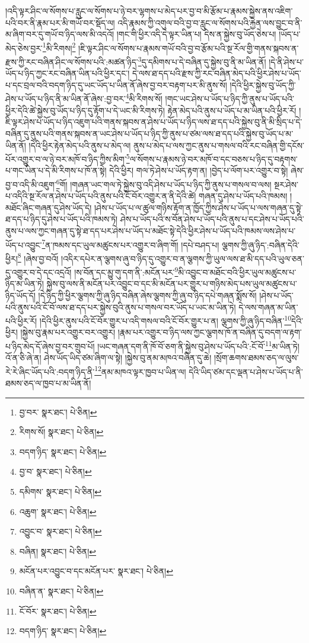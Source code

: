 །འདི་ལྟར་ཤིང་ལ་སོགས་པ་རླུང་ལ་སོགས་པ་ཉེ་བར་ལྷགས་པ་མེད་པར་བྱ་བ་མི་རྩོམ་པ་རྣམས་སྐྱེས་ནས་འཇིག་པའི་བར་ནི་རྣམ་པར་མི་གཡོ་བར་སྡོད་ལ། འདི་རྣམས་ཀྱི་འགུལ་བའི་བྱ་བ་རླུང་ལ་སོགས་པའི་རྐྱེན་ལས་བྱུང་བ་ནི་མ་ཞིག་བར་དུ་གཡོ་བ་ཉིད་ལས་མི་འདའོ། །གང་གི་ཕྱིར་འདི་དེ་ལྟར་ཡིན་པ། དེས་ན་སྐྱེས་བུ་ཡོད་ཅེས་པ། །ཡོད་པ་མེད་ཅེས་བྱར་\footnote{བྱ་བར་  སྣར་ཐང་།  པེ་ཅིན། }མི་རིགས།\footnote{རིགས་སོ།  སྣར་ཐང་།  པེ་ཅིན། } །ཇི་ལྟར་ཤིང་ལ་སོགས་པ་རྣམས་གཡོ་བའི་བྱ་བ་རྩོམ་པའི་སྔ་རོལ་གྱི་གནས་སྐབས་ན་རྫས་ཀྱི་རང་བཞིན་ཤིང་ལ་སོགས་པའི་:མཚན་ཉིད་\footnote{བདག་ཉིད་  སྣར་ཐང་།  པེ་ཅིན། }དུ་དམིགས་པ་དེ་བཞིན་དུ་སྐྱེས་བུ་ནི་མ་ཡིན་ནོ། །དེ་ནི་ཤེས་པ་ཡོད་པ་ཉིད་ཀྱང་རང་བཞིན་ཡིན་པའི་ཕྱིར་དང་། དེ་ལས་ཐ་དད་པའི་རྫས་ཀྱི་རང་བཞིན་མེད་པའི་ཕྱིར་ཤེས་པ་ཡོད་པ་དང་བྲལ་བའི་བདག་ཉིད་དུ་ཡང་ཡོད་པ་ཡིན་ནོ་ཞེས་བྱ་བར་བརྟག་པར་མི་ནུས་སོ། །དེའི་ཕྱིར་སྐྱེས་བུ་ཡོད་ཀྱི་ཤེས་པ་ཡོད་པ་ཉིད་ནི་མ་ཡིན་ནོ་ཞེས་:བྱ་བར་\footnote{བྱ་བ་  སྣར་ཐང་།  པེ་ཅིན། }མི་རིགས་སོ། །གང་ཡང་ཤེས་པ་ཡོད་པ་ཉིད་ཀྱི་ནུས་པ་ཡོད་པའི་ཕྱིར་དེའི་ཚེ་སྐྱེས་བུ་ཡོད་པ་ཉིད་དུ་རྟོག་པ་དེ་ཡང་མི་རིགས་ཏེ། རྟེན་མེད་པའི་ནུས་པ་ཡོད་པ་མ་ཡིན་པའི་ཕྱིར་རོ། །ཇི་ལྟར་ཤེས་པ་ཡོད་པ་ཉིད་འཇུག་པའི་གནས་སྐབས་ན་ཤེས་པ་ཡོད་པ་ཉིད་ལས་ཐ་དད་པའི་སྐྱེས་བུ་ནི་མི་སྲིད་པ་དེ་བཞིན་དུ་ནུས་པའི་གནས་སྐབས་ན་ཡང་ཤེས་པ་ཡོད་པ་ཉིད་ཀྱི་ནུས་པ་ཙམ་ལས་ཐ་དད་པའི་སྐྱེས་བུ་ཡོད་པ་མ་ཡིན་ནོ། །དེའི་ཕྱིར་རྟེན་མེད་པའི་ནུས་པ་མེད་ལ། ནུས་པ་མེད་པ་ལས་ཀྱང་ནུས་པ་གསལ་བའི་རང་བཞིན་གྱི་དངོས་པོར་འགྱུར་བ་ལ་ཉེ་བར་མཁོ་བ་ཉིད་ཀྱིས་མིག་\footnote{དམིགས་  སྣར་ཐང་།  པེ་ཅིན། }ལ་སོགས་པ་རྣམས་ཉེ་བར་མཁོ་བ་དང་བཅས་པ་ཉིད་དུ་བརྟགས་པ་གང་ཡིན་པ་དེ་མི་རིགས་པ་ཁོ་ན་སྟེ། དེའི་ཕྱིར། གལ་ཏེ་ཤེས་པ་ཡོད་རྟག་ན། །བྱེད་པ་ལོག་པར་འགྱུར་བ་སྟེ། ཞེས་བྱ་བ་འདི་མི་འཇུག་\footnote{འཆུག་  སྣར་ཐང་།  པེ་ཅིན། }གོ། །གཞན་ཡང་གལ་ཏེ་སྐྱེས་བུ་འདི་ཤེས་པ་ཡོད་པ་ཉིད་ཀྱི་ནུས་པ་གསལ་བ་ལས། སྔར་ཤེས་པ་འདིའི་སྔ་རོལ་ན་ཤེས་པ་ཡོད་པའི་ནུས་པའི་ངོ་བོར་འགྱུར་ན་ནི་དེའི་ཚེ། གཞན་དུ་ཤེས་པ་ཡོད་པའི་ཁམས། །མཐོང་ཞིང་གཞན་དུ་ཤེས་ཡོད་དེ། །ཤེས་པ་ཡོད་པ་ལ་ཚུལ་གཉིས་རྟོག་ན་ཁྱོད་ཀྱིས་ཤེས་པ་ཡོད་པ་ལས་གཞན་དུ་སྟེ་ཐ་དད་པ་ཉིད་དུ་ཤེས་པ་ཡོད་པའི་ཁམས་ཏེ། ཤེས་པ་ཡོད་པའི་ས་བོན་ཤེས་པ་ཡོད་པའི་ནུས་པ་དང་ཤེས་པ་ཡོད་པའི་ནུས་པ་ལས་ཀྱང་གཞན་དུ་སྟེ་ཐ་དད་པར་ཤེས་པ་ཡོད་པ་མཐོང་སྟེ་དེའི་ཕྱིར་ཤེས་པ་ཡོད་པའི་ཁམས་ལས་ཤེས་པ་ཡོད་པ་འབྱུང་\footnote{འབྱུང་བ་  སྣར་ཐང་།  པེ་ཅིན། }ན་ཁམས་དང་ཡུལ་མཚུངས་པར་འགྱུར་བ་ཞིག་གོ། །དཔེ་བཤད་པ། ལྕགས་ཀྱི་ཞུ་ཉིད་:བཞིན་དེའི་ཕྱིར།\footnote{བཞིན།  སྣར་ཐང་།  པེ་ཅིན། } །ཞེས་བྱ་བའོ། །འདིར་དཔེར་ན་ལྕགས་ཞུ་བ་ཉིད་དུ་འགྱུར་བ་ན་ལྕགས་ཀྱི་ཡུལ་ལས་ཐ་མི་དད་པའི་ཡུལ་ཅན་དུ་འགྱུར་བ་དེ་དང་འདྲའོ། །ས་བོན་དང་མྱུ་གུ་དག་ནི་:མངོན་པར་\footnote{མངོན་པར་འབྱུང་བ་དང་མངོན་པར་  སྣར་ཐང་།  པེ་ཅིན། }མི་འབྱུང་བ་མཐོང་བའི་ཕྱིར་ཡུལ་མཚུངས་པ་ཉིད་མ་ཡིན་ཏེ། སྐྱེས་བུ་ལས་ནི་མངོན་པར་འབྱུང་བ་དང་མི་མངོན་པར་གྱུར་པ་གཉིས་མེད་པས་ཡུལ་མཚུངས་པ་ཉིད་ཡོད་དོ། །དེ་ཉིད་ཀྱི་ཕྱིར་ལྕགས་ཀྱི་ཞུ་ཉིད་བཞིན་ཞེས་ལྕགས་ཀྱི་ཞུ་བ་ཉིད་དཔེ་གཞན་སྨོས་སོ། །ཤེས་པ་ཡོད་པའི་ནུས་པའི་ངོ་བོ་ལས་ཐ་དད་པར་སྐྱེས་བུའི་ནུས་པ་གསལ་བར་ཡོད་པ་ཡང་མ་ཡིན་ཏེ། དེ་ལས་གཞན་མ་ཡིན་པའི་ཕྱིར་རོ། །དེའི་ཕྱིར་ནུས་པའི་ངོ་བོར་གྱུར་པ་འདི་གསལ་བའི་ངོ་བོར་གྱུར་པ་ན། ལྕགས་ཀྱི་ཞུ་ཉིད་བཞིན་\footnote{བཞིན་ན་  སྣར་ཐང་།  པེ་ཅིན། }དེའི་ཕྱིར། །སྐྱེས་བུ་རྣམ་པར་འགྱུར་བར་འགྱུར། །རྣམ་པར་འགྱུར་བ་ཉིད་ལས་ཀྱང་ལྕགས་ཁོ་ན་བཞིན་དུ་བདག་ལ་རྟག་པ་ཉིད་མེད་དོ་ཞེས་བྱ་བར་གྲུབ་པོ། །ཡང་གཞན་དག་ནི་ཁོ་བོ་ཅག་ནི་སྐྱེས་བུ་ཤེས་པ་ཡོད་པའི་:ངོ་བོ་\footnote{ངོ་བོར་  སྣར་ཐང་།  པེ་ཅིན། }མ་ཡིན་ཏེ། འོ་ན་ཅི་ཞེ་ན། ཤེས་ཡོད་ཡིད་ཙམ་ཞིག་ལ་སྟེ། །སྐྱེས་བུ་ནམ་མཁའ་བཞིན་དུ་ཆེ། །སྲོག་ཆགས་ཐམས་ཅད་ལ་ལུས་རེ་རེ་ཞིང་ཡོད་པའི་:བདག་ཉིད་ནི་\footnote{བདག་ཉིད་  སྣར་ཐང་།  པེ་ཅིན། }ནམ་མཁའ་ལྟར་ཁྱབ་པ་ཡིན་ལ། དེའི་ཡིད་ཙམ་དང་ལྡན་པ་ཤེས་པ་ཡོད་པ་ནི་ཐམས་ཅད་ལ་ཁྱབ་པ་མ་ཡིན་ནོ། 